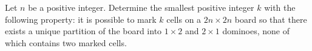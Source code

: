 Let $n$ be a positive integer. Determine the smallest positive integer $k$ with the following property: it is possible to mark $k$ cells on a $2n \times 2n$ board so that there exists a unique partition of the board into $1 \times 2$ and $2 \times 1$ dominoes, none of which contains two marked cells.
